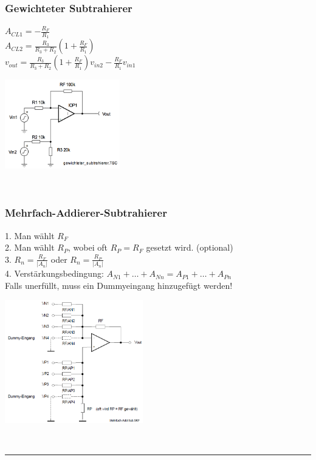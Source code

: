 		\begin{minipage}[c]{12cm}
		\subsubsection{Gewichteter Subtrahierer}
            	$A_{CL1}=- \frac{R_F}{R_1}$\\
            	$A_{CL2}=
           		\frac{R_3}{R_3+R_2}\left(1+\frac{R_F}{R_1}\right)$\\
            	$v_{out}=
            	\frac{R_3}{R_3+R_2}\left(1+\frac{R_F}{R_1}\right)
            	v_{in2}-\frac{R_F}{R_1}v_{in1}$\\
      	\end{minipage}
			\begin{minipage}{5cm}
            	\includegraphics[width=5cm]{./images/gewichtsub.png}
            \end{minipage}\\

		\begin{minipage}[b]{12cm}
		\subsubsection{Mehrfach-Addierer-Subtrahierer} 		
			1. Man wählt $R_{F}$\\
			2. Man wählt $R_{P}$, wobei oft $R_{P}=R_{F}$ gesetzt wird. (optional)\\
			3. $R_{n}=\frac{R_{F}}{\left|A_{n}\right|}$ oder
				$R_{n}=\frac{R_{P}}{\left|A_{n}\right|}$\\ 
			4. Verstärkungsbedingung: $A_{N1} +
			\ldots + A_{Nn} = A_{P1} + \ldots + A_{Pn}$ \\Falls unerfüllt, muss ein Dummyeingang hinzugefügt werden!
		\end{minipage}
		\begin{minipage}{6cm}
          	\includegraphics[width=6cm]{./images/mehrfach-addierer-subtrahierer.png} 
        \end{minipage}\\
\hrule

